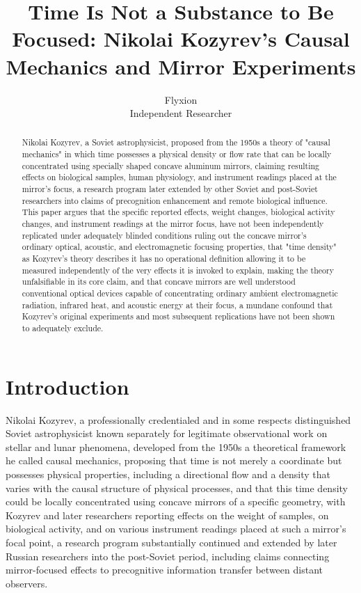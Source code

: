 \documentclass[11pt]{article}
\title{Time Is Not a Substance to Be Focused: Nikolai Kozyrev's Causal Mechanics and Mirror Experiments}
\author{Flyxion \\ \small Independent Researcher}
\date{}
\begin{document}
\maketitle

\begin{abstract}
Nikolai Kozyrev, a Soviet astrophysicist, proposed from the 1950s a theory of "causal mechanics" in which time possesses a physical density or flow rate that can be locally concentrated using specially shaped concave aluminum mirrors, claiming resulting effects on biological samples, human physiology, and instrument readings placed at the mirror's focus, a research program later extended by other Soviet and post-Soviet researchers into claims of precognition enhancement and remote biological influence. This paper argues that the specific reported effects, weight changes, biological activity changes, and instrument readings at the mirror focus, have not been independently replicated under adequately blinded conditions ruling out the concave mirror's ordinary optical, acoustic, and electromagnetic focusing properties, that "time density" as Kozyrev's theory describes it has no operational definition allowing it to be measured independently of the very effects it is invoked to explain, making the theory unfalsifiable in its core claim, and that concave mirrors are well understood conventional optical devices capable of concentrating ordinary ambient electromagnetic radiation, infrared heat, and acoustic energy at their focus, a mundane confound that Kozyrev's original experiments and most subsequent replications have not been shown to adequately exclude.
\end{abstract}

\section{Introduction}

Nikolai Kozyrev, a professionally credentialed and in some respects distinguished Soviet astrophysicist known separately for legitimate observational work on stellar and lunar phenomena, developed from the 1950s a theoretical framework he called causal mechanics, proposing that time is not merely a coordinate but possesses physical properties, including a directional flow and a density that varies with the causal structure of physical processes, and that this time density could be locally concentrated using concave mirrors of a specific geometry, with Kozyrev and later researchers reporting effects on the weight of samples, on biological activity, and on various instrument readings placed at such a mirror's focal point, a research program substantially continued and extended by later Russian researchers into the post-Soviet period, including claims connecting mirror-focused effects to precognitive information transfer between distant observers.
\end{document}
